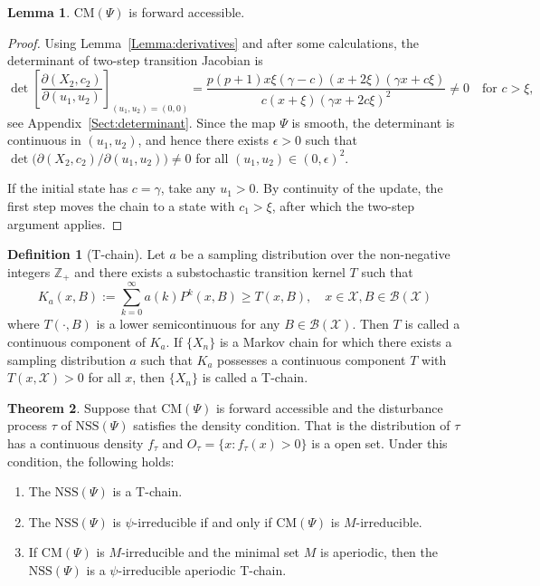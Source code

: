 \documentclass[11pt]{article}
\theoremstyle{definition}
\newtheorem{theorem}{Theorem}
\newtheorem{lemma}[theorem]{Lemma}
\newtheorem{definition}{Definition}
\begin{document}
\begin{lemma}
	$\mathrm{CM}(\Psi)$ is forward accessible.
\end{lemma}
\begin{proof}
	Using Lemma~\ref{Lemma:derivatives} and after some calculations, the determinant of two-step transition Jacobian is	
	$$
	\det\left[\frac{\partial(X_2,c_2)}{\partial(u_1,u_2)}\right]_{(u_1,u_2)=(0,0)}
	=
	\frac{p (p+1) x \xi (\gamma - c) (x+2\xi) (\gamma x + c \xi)}{c (x + \xi) (\gamma x + 2 c \xi)^2} \neq 0 \quad \text{for } c > \xi,
	$$
	see Appendix~\ref{Sect:determinant}.
	Since the map $\Psi$ is smooth, the determinant is continuous in $(u_1, u_2)$, and hence there exists $\epsilon>0$ such that
	$
	\det\big(\partial (X_2,c_2)/\partial(u_1,u_2)\big)\neq 0
	$
	for all $(u_1,u_2)\in (0,\epsilon)^2$. 
	
	If the initial state has $c=\gamma$, take any $u_1>0$.
	By continuity of the update, the first step moves the chain to a state with $c_1>\xi$, after which the two-step argument applies. 
\end{proof}

\begin{definition}[T-chain]
	Let $a$ be a sampling distribution over the non-negative integers $\mathbb{Z}_+$
	and there exists a substochastic transition kernel $T$ such that
	$$
	K_a(x, B) := \sum_{k=0}^{\infty} a(k) P^k(x, B) \geq T(x, B), \quad x \in \mathcal X, B \in \mathcal B(\mathcal X)
	$$
	where $T(\cdot, B)$ is a lower semicontinuous for any $B \in \mathcal B(\mathcal X)$.
	Then $T$ is called a continuous component of $K_a$.
	If $\{X_n\}$ is a Markov chain for which there exists a sampling distribution $a$ such that $K_a$ possesses a continuous component $T$ with $T(x, \mathcal X) > 0$ for all $x$, then $\{X_n\}$ is called a T-chain. 
\end{definition}

\begin{theorem}
	Suppose that $\mathrm{CM}(\Psi)$ is forward accessible and the disturbance process $\tau$ of $\mathrm{NSS}(\Psi)$ satisfies the density condition. 
	That is the distribution of $\tau$  has a continuous density $f_\tau$ and $O_\tau = \{x : f_\tau(x) > 0 \}$ is a open set.
	Under this condition, the following holds:
	\begin{enumerate}
		\item The $\mathrm{NSS}(\Psi)$ is a T-chain.
		\item The $\mathrm{NSS}(\Psi)$ is $\psi$-irreducible if and only if $\mathrm{CM}(\Psi)$ is $M$-irreducible.
		\item If $\mathrm{CM}(\Psi)$ is $M$-irreducible and the minimal set $M$ is aperiodic, then the $\mathrm{NSS}(\Psi)$ is a $\psi$-irreducible aperiodic T-chain.
	\end{enumerate}
\end{theorem}
\end{document}

